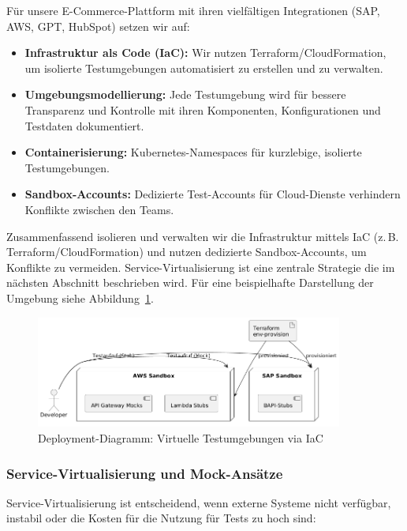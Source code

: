 Für unsere E-Commerce-Plattform mit ihren vielfältigen Integrationen (SAP, AWS, GPT, HubSpot) setzen wir auf:

\begin{itemize}
    \item \textbf{Infrastruktur als Code (IaC):} Wir nutzen Terraform/CloudFormation, um isolierte
    Testumgebungen automatisiert zu erstellen und zu verwalten.
    \item \textbf{Umgebungsmodellierung:} Jede Testumgebung wird für bessere Transparenz und
    Kontrolle mit ihren Komponenten, Konfigurationen und Testdaten dokumentiert.
    \item \textbf{Containerisierung:} Kubernetes-Namespaces für kurzlebige, isolierte Testumgebungen.
    \item \textbf{Sandbox-Accounts:} Dedizierte Test-Accounts für Cloud-Dienste verhindern
    Konflikte zwischen den Teams.
\end{itemize}

Zusammenfassend isolieren und verwalten wir die Infrastruktur mittels IaC
(z.\,B. Terraform/CloudFormation) und nutzen dedizierte Sandbox-Accounts, um Konflikte zu vermeiden.
Service-Virtualisierung ist eine zentrale Strategie die im nächsten Abschnitt beschrieben wird.
Für eine beispielhafte Darstellung der Umgebung siehe Abbildung~\ref{fig:deployment}.

\begin{figure}[h!]
    \centering
    \includegraphics[width=0.9\textwidth]{fig/stubing.png}
    \caption{Deployment-Diagramm: Virtuelle Testumgebungen via IaC}
    \label{fig:deployment}
\end{figure}

\subsubsection{Service-Virtualisierung und Mock-Ansätze}
Service-Virtualisierung ist entscheidend, wenn externe Systeme nicht verfügbar, instabil oder die
Kosten für die Nutzung für Tests zu hoch sind:

